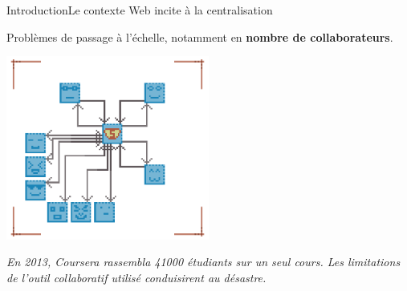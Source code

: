 \begin{frame}{Introduction}{Le contexte Web incite à la centralisation}
  

  Problèmes de passage à l'échelle, notamment en \textbf{nombre de
    collaborateurs}.
  
  \vspace{0.5cm}
  
  \begin{center}
    \includegraphics[width=0.5\textwidth]{img/centralizedcpuproblems.png}
  \end{center}
  
  \vspace{0.5cm}

  \textit{En 2013, Coursera rassembla 41000 étudiants sur un seul cours.  Les
    limitations de l'outil collaboratif utilisé conduisirent au \og
    désastre\fg.}%






\end{frame}
